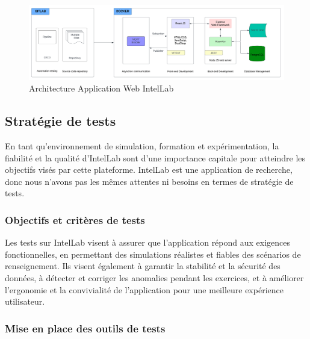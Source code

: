 \begin{figure}[h]
	\center%
	\includegraphics[width=\textwidth]{./images/architectur_intellab.png}
	\caption[Architecture Application Web IntelLab]{Architecture Application Web IntelLab}\label{fig:architectur_intellab}
\end{figure}


\subsection{Stratégie de tests}

En tant qu'environnement de simulation, formation et expérimentation, la fiabilité et la qualité d’IntelLab sont d'une importance capitale pour atteindre les objectifs visés par cette plateforme.
IntelLab est une application de recherche, donc nous n’avons pas les mêmes attentes ni besoins en termes de stratégie de tests.


\subsubsection{Objectifs et critères de tests}
Les tests sur IntelLab visent à assurer que l'application répond aux exigences fonctionnelles, en permettant des simulations réalistes et fiables des scénarios de renseignement.
Ils visent également à garantir la stabilité et la sécurité des données, à détecter et corriger les anomalies pendant les exercices, et à améliorer l'ergonomie et la convivialité de l'application pour une meilleure expérience utilisateur.


\subsubsection{Mise en place des outils de tests}

